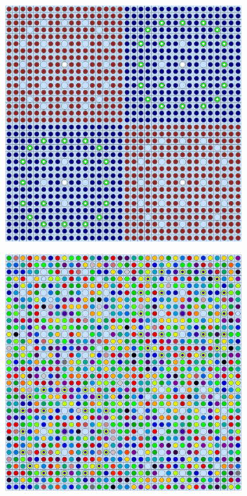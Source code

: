 \begin{figure}[h!]
\begin{subfigure}{.5\textwidth}
\end{subfigure}
\begin{subfigure}{.5\textwidth}
  \centering
  \includegraphics[width=0.8\linewidth]{figures/quantification/homogenization/2x2-null-materials}
  \caption{}
  \label{fig:chap8-2x2-null-materials}
\end{subfigure}%
\begin{subfigure}{.5\textwidth}
  \centering
  \includegraphics[width=0.8\linewidth]{figures/quantification/homogenization/2x2-degenerate-materials}
  \caption{}
  \label{fig:chap8-2x2-degenerate-materials}
\end{subfigure}

\end{figure}
